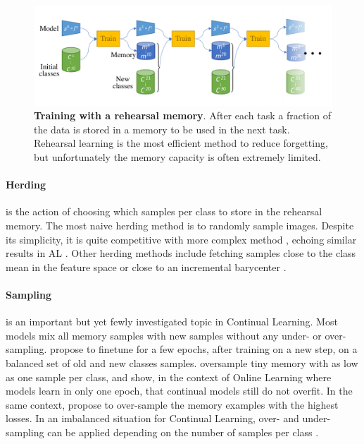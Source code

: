 \begin{figure}[tb]
      \begin{center}
            \includegraphics[width=1.0\linewidth]{images/related/rehearsal}
      \end{center}
      \caption{\textbf{Training with a rehearsal memory}. After each task a fraction of the
            data is stored in a memory to be used in the next task. Rehearsal learning is the most
            efficient method to reduce forgetting, but unfortunately the memory capacity is often
            extremely limited.}
      \label{fig:related_protocol_rehearsal}
\end{figure}

\paragraph{Herding} is the action of choosing which samples per class to store in the rehearsal
memory. The most naive herding method is to randomly sample images. Despite its simplicity, it is
quite competitive with more complex method \citep{castro2018end_to_end_inc_learn}, echoing similar
results in \ac{AL} \citep{gal2017activelearning}. Other herding methods include fetching samples
close to the class mean in the feature space \citep{castro2018end_to_end_inc_learn} or close to an
incremental barycenter \citep{rebuffi2017icarl}.

\paragraph{Sampling} is an important but yet fewly investigated topic in Continual Learning. Most
models mix all memory samples with new samples without any under- or over-sampling.
\citet{castro2018end_to_end_inc_learn} propose to finetune for a few epochs, after training on a new
step, on a balanced set of old and new classes samples. \citet{chaudhry2019tinyepisodicmemories}
oversample tiny memory with as low as one sample per class, and show, in the context of Online
Learning where models learn in only one epoch, that continual models still do not overfit. In the
same context, \citet{aljundi2019maximallyinterfered} propose to over-sample the memory examples with
the highest losses. In an imbalanced situation for Continual Learning, over- and under-sampling can be
applied depending on the number of samples per class \citep{kim2020imbalancedcontinual}.

